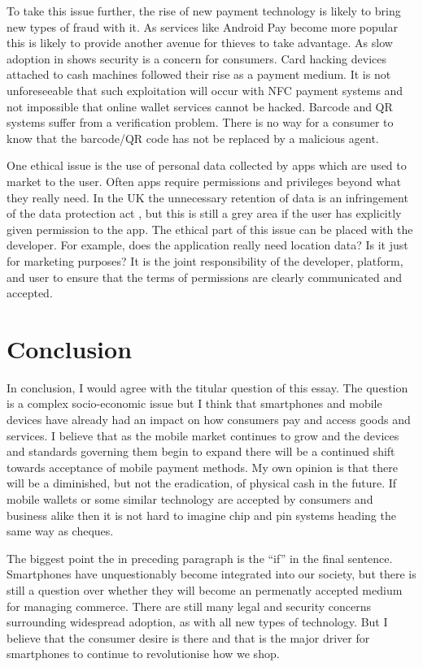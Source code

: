 \documentclass[paper=a4, fontsize=12pt]{scrartcl}	%
\numberwithin{equation}{section}															%
\numberwithin{figure}{section}																%
\numberwithin{table}{section}
\begin{document}
To take this issue further, the rise of new payment technology is likely to bring new types of fraud with it. As services like Android Pay become more popular this is likely to provide another avenue for thieves to take advantage. As slow adoption in \cite{pymnts2015apple} shows security is a concern for consumers. Card hacking devices attached to cash machines followed their rise as a payment medium. It is not unforeseeable that such exploitation will occur with NFC payment systems and not impossible that online wallet services cannot be hacked. Barcode and QR systems suffer from a verification problem. There is no way for a consumer to know that the barcode/QR code has not be replaced by a malicious agent.

One ethical issue is the use of personal data collected by apps which are used to market to the user. Often apps require permissions and privileges beyond what they really need. In the UK the  unnecessary retention of data is an infringement of the data protection act \cite{uk1998data}, but this is still a grey area if the user has explicitly given permission to the app. The ethical part of this issue can be placed with the developer. For example, does the application really need location data? Is it just for marketing purposes? It is the joint responsibility of the developer, platform, and user to ensure that the terms of permissions are clearly communicated and accepted.

\section{Conclusion}

In conclusion, I would agree with the titular question of this essay. The question is a complex socio-economic issue but I think that smartphones and mobile devices have already had an impact on how consumers pay and access goods and services. I believe that as the mobile market continues to grow and the devices and standards governing them begin to expand there will be a continued shift towards acceptance of mobile payment methods. My own opinion is that there will be a diminished, but not the eradication, of physical cash in the future. If mobile wallets or some similar technology are accepted by consumers and business alike then it is not hard to imagine chip and pin systems heading the same way as cheques. 

The biggest point the in preceding paragraph is the ``if'' in the final sentence. Smartphones have unquestionably become integrated into our society, but there is still a question over whether they will become an permenatly accepted medium for managing commerce. There are still many legal and security concerns surrounding widespread adoption, as with all new types of technology. But I believe that the consumer desire is there and that is the major driver for smartphones to continue to revolutionise how we shop.



\end{document}
